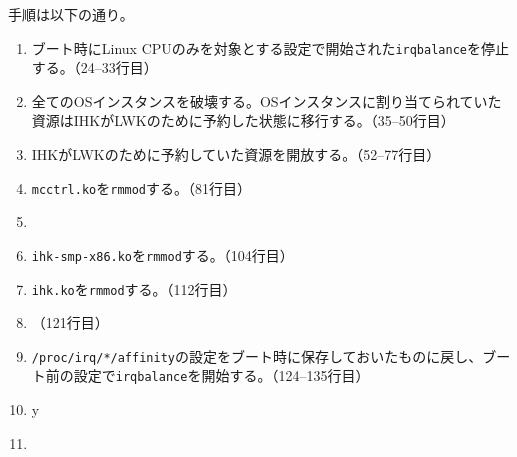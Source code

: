 \documentclass[twoside,11pt,fleqn]{book}
\begin{document}
手順は以下の通り。
\begin{enumerate}
\item ブート時にLinux CPUのみを対象とする設定で開始された\texttt{irqbalance}を停止する。（24--33行目）
\item 全てのOSインスタンスを破壊する。OSインスタンスに割り当てられていた資源はIHKがLWKのために予約した状態に移行する。（35--50行目）
\item IHKがLWKのために予約していた資源を開放する。（52--77行目）
\item \texttt{mcctrl.ko}を\texttt{rmmod}する。（81行目）
\item {}
\item \texttt{ihk-smp-x86.ko}を\texttt{rmmod}する。（104行目）
\item \texttt{ihk.ko}を\texttt{rmmod}する。（112行目）
\item {}（121行目）
\item \texttt{/proc/irq/*/affinity}の設定をブート時に保存しておいたものに戻し、ブート前の設定で\texttt{irqbalance}を開始する。（124--135行目）
\item {}
\ifx \HLDIFFJULTWO y
\item {}
\fi
\end{enumerate}




\end{document}
